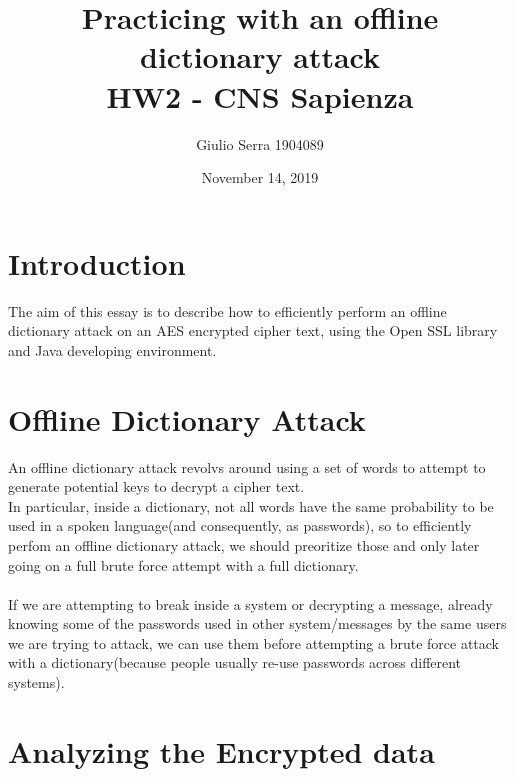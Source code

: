 \documentclass{article}
\begin{document}
\pagecolor{white}

\title{%
  Practicing with an offline dictionary attack \\
  \large HW2 - CNS Sapienza}

\author{Giulio Serra 1904089}
\date{November 14, 2019}

\maketitle

\begin{titlepage}
\end{titlepage}

\tableofcontents

\begin{titlepage}
\end{titlepage}

\section{Introduction}\label{sec:intro}
The aim of this essay is to describe how to efficiently perform an offline dictionary attack on an AES encrypted cipher text, using the Open SSL library and Java developing environment.\\

\section{Offline Dictionary Attack}\label{sec:offdic}

An offline dictionary attack revolvs around using a set of words to attempt to generate potential keys to decrypt a cipher text.\\In particular, inside a dictionary, not all words have the same probability to be used in a spoken language(and consequently, as passwords), so to efficiently perfom an offline dictionary attack, we should preoritize those and only later going on a full brute force attempt with a full dictionary.\\\\
If we are attempting to break inside a system or decrypting a message, already knowing some of the passwords used in other system/messages by the same users we are trying to attack, we can use them before attempting a brute force attack with a dictionary(because people usually re-use passwords across different systems).\\

\section{Analyzing the Encrypted data}\label{sec:anled}
\end{document}
